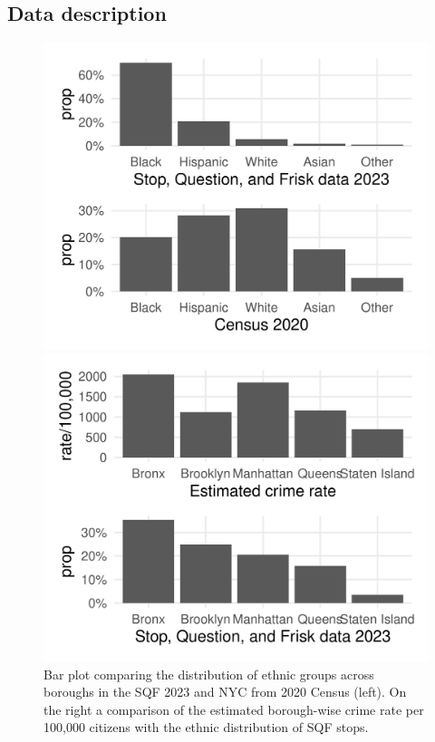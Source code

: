 \subsection{Data description}
\begin{figure}
  \centering
  \begin{minipage}{0.49\textwidth}
      \centering
      \includegraphics[width=\textwidth]{../figures/sqf_case_study_plot6.pdf}
  \end{minipage}
  \hfill
  \begin{minipage}{0.49\textwidth}
      \centering
      \includegraphics[width=\textwidth]{../figures/sqf_case_study_plot14.pdf}
  \end{minipage}
  \caption{Bar plot comparing the distribution of ethnic groups across boroughs in the SQF 2023 and NYC from 2020 Census (left). On the right a comparison of the estimated borough-wise crime rate per 100,000 citizens with the ethnic distribution of SQF stops.}
  \label{fig:race_distributions}
\end{figure}

